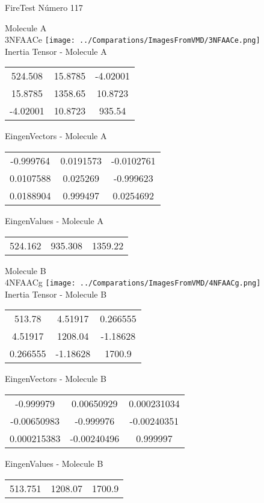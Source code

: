 \vtab[-2cm]
\begin{center}
{\large FireTest \tab Número 117}
\end{center}
\begin{multicols}{2}
\begin{center}

Molecule A \\ 
3NFAACe
\texttt{[image: ../Comparations/ImagesFromVMD/3NFAACe.png]}
\\
Inertia Tensor - Molecule A \\
\vtab

\begin{tabular}{|c c c|}
524.508	 & 	15.8785	 & 	-4.02001	 \\
15.8785	 & 	1358.65	 & 	10.8723	 \\
-4.02001	 & 	10.8723	 & 	935.54
\end{tabular}

\vtab
 EingenVectors - Molecule A     \\
\vtab
\begin{tabular}{|c c c|}
-0.999764	 & 	0.0191573	 & 	-0.0102761	 \\
0.0107588	 & 	0.025269	 & 	-0.999623	 \\
0.0188904	 & 	0.999497	 & 	0.0254692
\end{tabular}

\vtab
 EingenValues - Molecule A     \\
\vtab
\begin{tabular}{|c c c|}
524.162	 & 	935.308	 & 	1359.22	 \\
\end{tabular}
\columnbreak

Molecule B \\ 
4NFAACg
\texttt{[image: ../Comparations/ImagesFromVMD/4NFAACg.png]}
\\
Inertia Tensor - Molecule B \\
\vtab

\begin{tabular}{|c c c|}
513.78	 & 	4.51917	 & 	0.266555	 \\
4.51917	 & 	1208.04	 & 	-1.18628	 \\
0.266555	 & 	-1.18628	 & 	1700.9
\end{tabular}

\vtab
 EingenVectors - Molecule B     \\
\vtab
\begin{tabular}{|c c c|}
-0.999979	 & 	0.00650929	 & 	0.000231034	 \\
-0.00650983	 & 	-0.999976	 & 	-0.00240351	 \\
0.000215383	 & 	-0.00240496	 & 	0.999997
\end{tabular}

\vtab
 EingenValues - Molecule B     \\
\vtab
\begin{tabular}{|c c c|}
513.751	 & 	1208.07	 & 	1700.9	 \\
\end{tabular}

\end{center}
\end{multicols}

